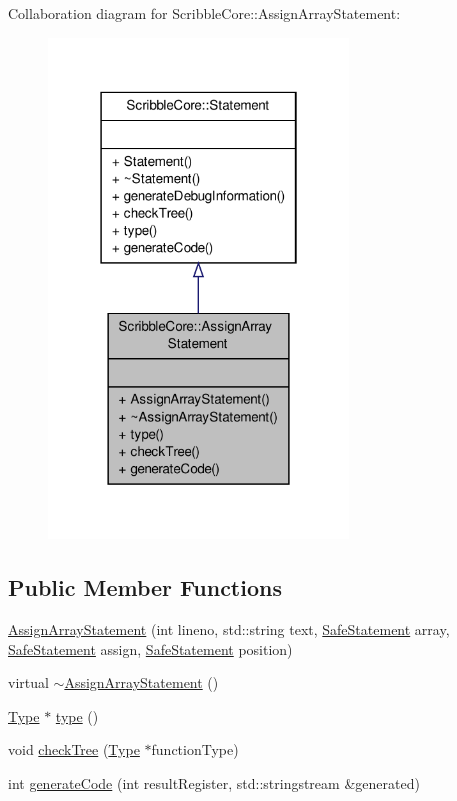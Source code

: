 Collaboration diagram for Scribble\-Core\-:\-:Assign\-Array\-Statement\-:
\nopagebreak
\begin{figure}[H]
\begin{center}
\leavevmode
\includegraphics[width=226pt]{class_scribble_core_1_1_assign_array_statement__coll__graph}
\end{center}
\end{figure}
\subsection*{Public Member Functions}
\begin{DoxyCompactItemize}
\item 
\hyperlink{class_scribble_core_1_1_assign_array_statement_a1ee1ce9e49bb0c1c03f80cfb8e5d115d}{Assign\-Array\-Statement} (int lineno, std\-::string text, \hyperlink{namespace_scribble_core_a2ad5bf236bc9164cb56f564685f15a11}{Safe\-Statement} array, \hyperlink{namespace_scribble_core_a2ad5bf236bc9164cb56f564685f15a11}{Safe\-Statement} assign, \hyperlink{namespace_scribble_core_a2ad5bf236bc9164cb56f564685f15a11}{Safe\-Statement} position)
\item 
virtual \hyperlink{class_scribble_core_1_1_assign_array_statement_a3fb03ffb22b5c1ea1cd3bfdd024baec8}{$\sim$\-Assign\-Array\-Statement} ()
\item 
\hyperlink{class_scribble_core_1_1_type}{Type} $\ast$ \hyperlink{class_scribble_core_1_1_assign_array_statement_ac178b7f29bff1248d3a88023ae47eb96}{type} ()
\item 
void \hyperlink{class_scribble_core_1_1_assign_array_statement_a5346d4acadb05916f47da731f23f70ef}{check\-Tree} (\hyperlink{class_scribble_core_1_1_type}{Type} $\ast$function\-Type)
\item 
int \hyperlink{class_scribble_core_1_1_assign_array_statement_a53d2ef3cb8185606f678d7d60a8da426}{generate\-Code} (int result\-Register, std\-::stringstream \&generated)
\end{DoxyCompactItemize}


